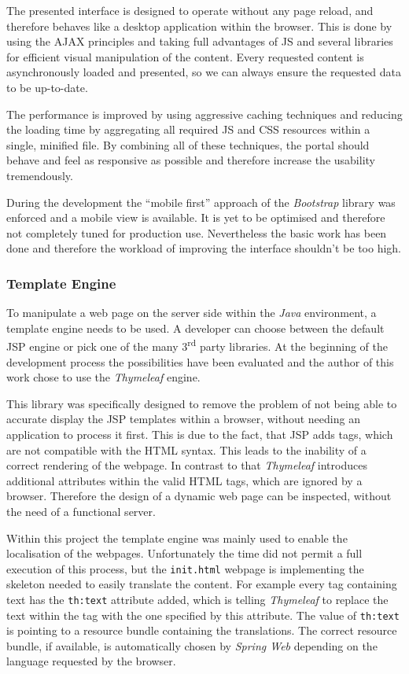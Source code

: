 The presented interface is designed to operate without any page reload, and therefore behaves like a desktop application within the browser. This is done by using the \gls{AJAX} principles and taking full advantages of \gls{JS} and several libraries for efficient visual manipulation of the content. Every requested content is asynchronously loaded and presented, so we can always ensure the requested data to be up-to-date.

The performance is improved by using aggressive caching techniques and reducing the loading time by aggregating all required \gls{JS} and \gls{CSS} resources within a single, minified file. By combining all of these techniques, the portal should behave and feel as responsive as possible and therefore increase the usability tremendously.

During the development the \enquote{mobile first} approach of the \emph{Bootstrap} library was enforced and a mobile view is available. It is yet to be optimised and therefore not completely tuned for production use. Nevertheless the basic work has been done and therefore the workload of improving the interface shouldn't be too high.

\subsubsection{Template Engine}

To manipulate a web page on the server side within the \emph{Java} environment, a template engine needs to be used. A developer can choose between the default \gls{JSP} engine or pick one of the many 3\textsuperscript{rd} party libraries. At the beginning of the development process the possibilities have been evaluated and the author of this work chose to use the \emph{Thymeleaf} engine.

This library was specifically designed to remove the problem of not being able to accurate display the \gls{JSP} templates within a browser, without needing an application to process it first. This is due to the fact, that \gls{JSP} adds tags, which are not compatible with the \gls{HTML} syntax. This leads to the inability of a correct rendering of the webpage. In contrast to that \emph{Thymeleaf} introduces additional attributes within the valid \gls{HTML} tags, which are ignored by a browser. Therefore the design of a dynamic web page can be inspected, without the need of a functional server.

Within this project the template engine was mainly used to enable the localisation of the webpages. Unfortunately the time did not permit a full execution of this process, but the \texttt{init.html} webpage is implementing the skeleton needed to easily translate the content. For example every tag containing text has the \texttt{th:text} attribute added, which is telling \emph{Thymeleaf} to replace the text within the tag with the one specified by this attribute. The value of \texttt{th:text} is pointing to a resource bundle containing the translations. The correct resource bundle, if available, is automatically chosen by \emph{Spring Web} depending on the language requested by the browser.

